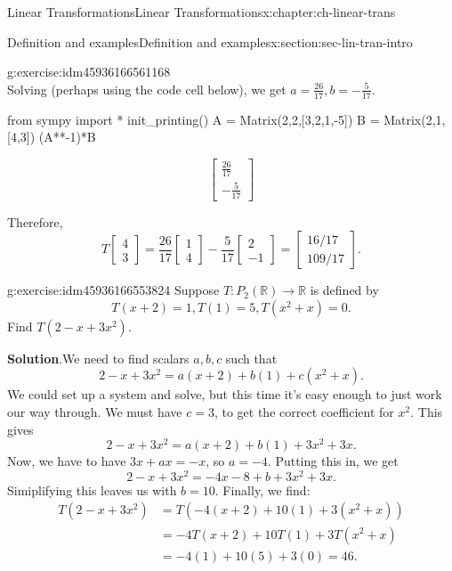 \documentclass[oneside,10pt,]{book}
\newcommand{\blocktitlefont}{\relax}
\numberwithin{equation}{section}
\newcommand{\bbm}{\begin{bmatrix}}
\newcommand{\ebm}{\end{bmatrix}}
\newcommand{\R}{\mathbb{R}}
\newcommand{\amp}{&}
\begin{document}
\begin{chapterptx}{Linear Transformations}{}{Linear Transformations}{}{}{x:chapter:ch-linear-trans}
\begin{sectionptx}{Definition and examples}{}{Definition and examples}{}{}{x:section:sec-lin-tran-intro}
\begin{inlineexercise}{}{g:exercise:idm45936166561168}
\begin{equation*}
\end{equation*}
Solving (perhaps using the code cell below), we get \(a=\frac{26}{17}, b = -\frac{5}{17}\).%
\begin{sageinput}
from sympy import *
init_printing()
A = Matrix(2,2,[3,2,1,-5])
B = Matrix(2,1,[4,3])
(A**-1)*B
\end{sageinput}
\begin{sageoutput}
\[\bbm \frac{26}{17}\\-\frac{5}{17}\ebm\]
\end{sageoutput}
Therefore,%
\begin{equation*}
T\bbm 4\\3\ebm = \frac{26}{17}\bbm 1\\4\ebm -\frac{5}{17}\bbm 2\\-1\ebm = \bbm 16/17\\109/17\ebm\text{.}
\end{equation*}
%
\end{inlineexercise}%
\begin{inlineexercise}{}{g:exercise:idm45936166553824}%
Suppose \(T:P_2(\R)\to \R\) is defined by%
\begin{equation*}
T(x+2)=1, T(1)=5, T(x^2+x)=0.
\end{equation*}
Find \(T(2-x+3x^2)\).%
\par\smallskip%
\noindent\textbf{\blocktitlefont Solution}.\label{g:solution:idm45936166551936}{}\hypertarget{g:solution:idm45936166551936}{}\quad{}We need to find scalars \(a,b,c\) such that%
\begin{equation*}
2-x+3x^2 = a(x+2)+b(1)+c(x^2+x)\text{.}
\end{equation*}
We could set up a system and solve, but this time it's easy enough to just work our way through. We must have \(c=3\), to get the correct coefficient for \(x^2\). This gives%
\begin{equation*}
2-x+3x^2=a(x+2)+b(1)+3x^2+3x\text{.}
\end{equation*}
Now, we have to have \(3x+ax=-x\), so \(a=-4\). Putting this in, we get%
\begin{equation*}
2-x+3x^2=-4x-8+b+3x^2+3x\text{.}
\end{equation*}
Simiplifying this leaves us with \(b=10\). Finally, we find:%
\begin{align*}
T(2-x+3x^2) \amp = T(-4(x+2)+10(1)+3(x^2+x)) \\
\amp = -4T(x+2)+10T(1)+3T(x^2+x)\\
\amp = -4(1)+10(5)+3(0) = 46\text{.}
\end{align*}

\end{inlineexercise}
\end{sectionptx}
\end{chapterptx}
\end{document}
